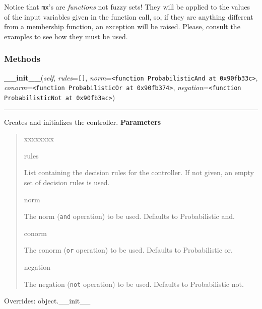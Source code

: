 Notice that \texttt{mx}'s are \emph{functions} not fuzzy sets! They will be applied to
the values of the input variables given in the function call, so, if they
are anything different from a membership function, an exception will be
raised. Please, consult the examples to see how they must be used.


  \subsubsection{Methods}

    \vspace{0.5ex}

\hspace{.8\funcindent}\begin{boxedminipage}{\funcwidth}

    \raggedright \textbf{\_\_init\_\_}(\textit{self}, \textit{rules}={\tt \texttt{[}\texttt{]}}, \textit{norm}={\tt {\textless}function ProbabilisticAnd at 0x90fb33c{\textgreater}}, \textit{conorm}={\tt {\textless}function ProbabilisticOr at 0x90fb374{\textgreater}}, \textit{negation}={\tt {\textless}function ProbabilisticNot at 0x90fb3ac{\textgreater}})

    \vspace{-1.5ex}

    \rule{\textwidth}{0.5\fboxrule}
\setlength{\parskip}{2ex}

Creates and initializes the controller.
\setlength{\parskip}{1ex}
      \textbf{Parameters}
      \vspace{-1ex}

      \begin{quote}
        \begin{Ventry}{xxxxxxxx}

          \item[rules]


List containing the decision rules for the controller. If not given,
an empty set of decision rules is used.
          \item[norm]


The norm (\texttt{and} operation) to be used. Defaults to Probabilistic
and.
          \item[conorm]


The conorm (\texttt{or} operation) to be used. Defaults to Probabilistic
or.
          \item[negation]


The negation (\texttt{not} operation) to be used. Defaults to
Probabilistic not.
        \end{Ventry}

      \end{quote}

      Overrides: object.\_\_init\_\_

    \end{boxedminipage}

